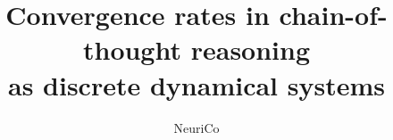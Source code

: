 \documentclass{amsart}
\title[Convergence rates in chain-of-thought reasoning]{Convergence rates in chain-of-thought reasoning\\as discrete dynamical systems}
\author{NeuriCo}
\theoremstyle{definition}
\theoremstyle{remark}
\numberwithin{equation}{section}
\begin{document}
\begin{abstract}

\end{abstract}

\maketitle









\end{document}
